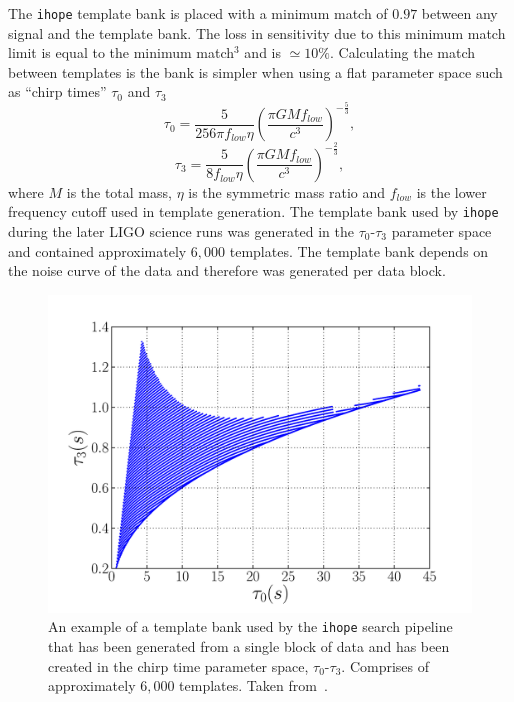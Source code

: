 The \verb|ihope| template bank is placed with a minimum match of $0.97$ between any signal and the template bank. The loss in sensitivity due to this minimum match limit is equal to the minimum match$^{3}$ and is $\simeq 10\%$. Calculating the match between templates is the bank is simpler when using a flat parameter space such as ``chirp times'' $\tau_{0}$ and $\tau_{3}$~\cite{Droz:1999}
%
\begin{equation}
    \tau_{0} = \frac{5}{256\pi f_{low}\eta}\left(\frac{\pi G M f_{low}}{c^{3}}\right)^{-\frac{5}{3}},
\end{equation}
%
\begin{equation}
    \tau_{3} = \frac{5}{8 f_{low}\eta}\left(\frac{\pi G M f_{low}}{c^{3}}\right)^{-\frac{2}{3}},
\end{equation}
%
where $M$ is the total mass, $\eta$ is the symmetric mass ratio and $f_{low}$ is the lower frequency cutoff used in template generation. The template bank used by \verb|ihope| during the later LIGO science runs was generated in the $\tau_{0}$-$\tau_{3}$ parameter space and contained approximately $6,000$ templates. The template bank depends on the noise curve of the data and therefore was generated per data block.
%
\begin{figure}
    \centering
    \includegraphics[width=1.0\linewidth]{images/2_searches/ihope_template_bank.pdf}
    \caption{An example of a template bank used by the \verb|ihope| search pipeline that has been generated from a single block of data and has been created in the chirp time parameter space, $\tau_{0}$-$\tau_{3}$. Comprises of approximately $6,000$ templates. Taken from~\cite{IHOPE:2012zx}.}
    \label{2:fig:ihope-template-bank}
\end{figure}
%

